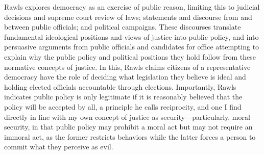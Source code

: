 Rawls explores democracy as an exercise of public reason, limiting this to judicial decisions and supreme court review of laws; statements and discourse from and between public officials; and political campaigns.  These discourses translate fundamental ideological positions and views of justice into public policy, and into persuasive arguments from public officials and candidates for office attempting to explain why the public policy and political positions they hold follow from these normative concepts of justice.  In this, Rawls claims citizens of a representative democracy have the role of deciding what legislation they believe is ideal and holding elected officials accountable through elections.  Importantly, Rawls indicates public policy is only legitimate if it is reasonably believed that the policy will be accepted by all, a principle he calls reciprocity, and one I find directly in line with my own concept of justice as security—particularly, moral security, in that public policy may prohibit a moral act but may not require an immoral act, as the former restricts behaviors while the latter forces a person to commit what they perceive as evil.
